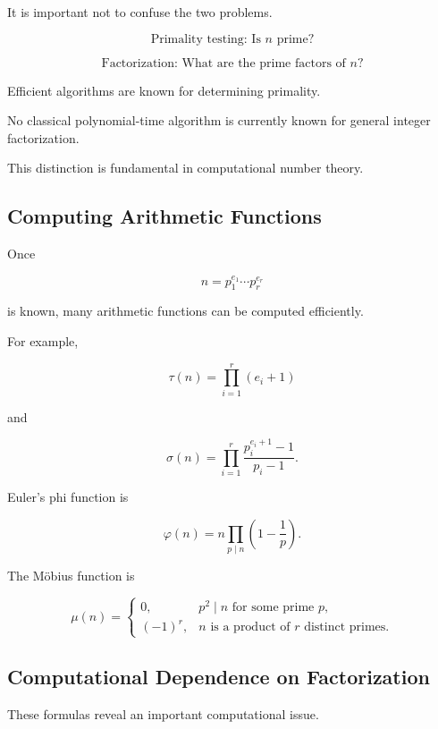 It is important not to confuse the two problems.

\[
\boxed{
\text{Primality testing: Is }n\text{ prime?}
}
\]

\[
\boxed{
\text{Factorization: What are the prime factors of }n\text{?}
}
\]

Efficient algorithms are known for determining primality.

No classical polynomial-time algorithm is currently known for general
integer factorization.

This distinction is fundamental in computational number theory.

\subsection{Computing Arithmetic Functions}
\label{subsec:computing-arithmetic-functions}

Once

\[ n=p_1^{e_1}\cdots p_r^{e_r} \]

is known, many arithmetic functions can be computed efficiently.

For example,

\[ \boxed{\tau(n)=\prod_{i=1}^{r}(e_i+1)} \]

and

\[ \boxed{\sigma(n)=\prod_{i=1}^{r}\frac{p_i^{e_i+1}-1}{p_i-1}}. \]

Euler's phi function is

\[ \boxed{\varphi(n)=n\prod_{p\mid n}\left(1-\frac1p\right).} \]

The Möbius function is

\[
\mu(n)=
\begin{cases}
0, & p^2\mid n\text{ for some prime }p,\\
(-1)^r, & n\text{ is a product of }r\text{ distinct primes}.
\end{cases}
\]

\subsection{Computational Dependence on Factorization}
\label{subsec:functions-depend-factorization}

These formulas reveal an important computational issue.

